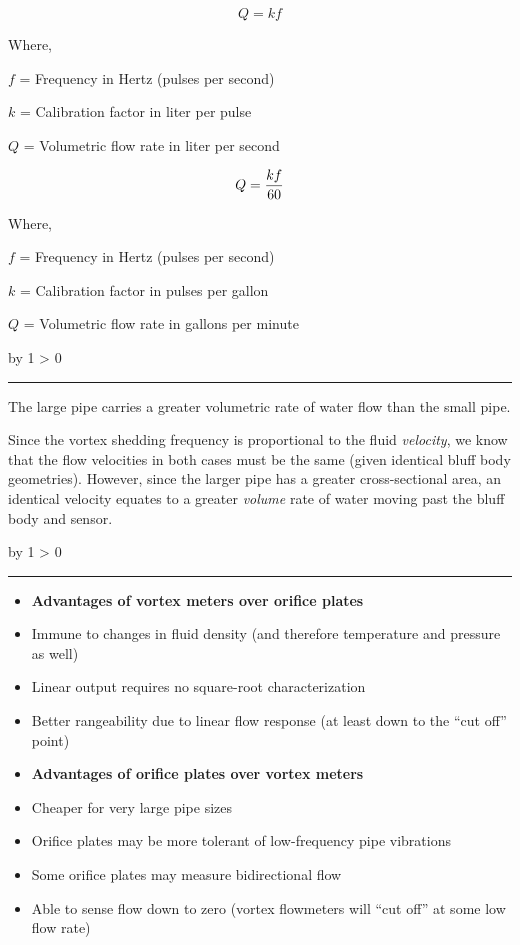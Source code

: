 \documentclass[12pt,a4paper]{article}
\def\svar{
           \advance\answnum by 1
           \ifnum \answnum > 0
                \hrule
                \vskip 3pt
                \leftline{Svar \the\answnum}
                \vskip 3pt \fi}
\begin{document}
$$Q = kf$$

\noindent
Where,

$f$ = Frequency in Hertz (pulses per second)

$k$ = Calibration factor in liter per pulse

$Q$ = Volumetric flow rate in liter per second

\vskip 10pt

$$Q = {kf \over 60}$$

\noindent
Where,

$f$ = Frequency in Hertz (pulses per second)

$k$ = Calibration factor in pulses per gallon

$Q$ = Volumetric flow rate in gallons per minute


\vskip 10pt \filbreak 
\svar{} 

The large pipe carries a greater volumetric rate of water flow than the small pipe.

\vskip 10pt

Since the vortex shedding frequency is proportional to the fluid {\it velocity}, we know that the flow velocities in both cases must be the same (given identical bluff body geometries).  However, since the larger pipe has a greater cross-sectional area, an identical velocity equates to a greater {\it volume} rate of water moving past the bluff body and sensor.

\vskip 10pt \filbreak 
\svar{} 

\begin{itemize}
\item{} {\bf Advantages of vortex meters over orifice plates}
\item{} Immune to changes in fluid density (and therefore temperature and pressure as well)
\item{} Linear output requires no square-root characterization
\item{} Better rangeability due to linear flow response (at least down to the ``cut off'' point)
\end{itemize}

\begin{itemize}
\item{} {\bf Advantages of orifice plates over vortex meters}
\item{} Cheaper for very large pipe sizes
\item{} Orifice plates may be more tolerant of low-frequency pipe vibrations
\item{} Some orifice plates may measure bidirectional flow
\item{} Able to sense flow down to zero (vortex flowmeters will ``cut off'' at some low flow rate)
\end{itemize}
\end{document}
